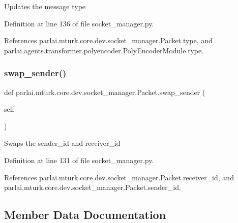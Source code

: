 \begin{DoxyVerb}Updates the message type\end{DoxyVerb}
 

Definition at line 136 of file socket\+\_\+manager.\+py.



References parlai.\+mturk.\+core.\+dev.\+socket\+\_\+manager.\+Packet.\+type, and parlai.\+agents.\+transformer.\+polyencoder.\+Poly\+Encoder\+Module.\+type.

\mbox{\label{classparlai_1_1mturk_1_1core_1_1dev_1_1socket__manager_1_1Packet_a52713ae6c40a1c3ef54c309baee5f092}} 
\subsubsection{\texorpdfstring{swap\+\_\+sender()}{swap\_sender()}}
{\footnotesize\ttfamily def parlai.\+mturk.\+core.\+dev.\+socket\+\_\+manager.\+Packet.\+swap\+\_\+sender (\begin{DoxyParamCaption}\item[{}]{self }\end{DoxyParamCaption})}

\begin{DoxyVerb}Swaps the sender_id and receiver_id\end{DoxyVerb}
 

Definition at line 131 of file socket\+\_\+manager.\+py.



References parlai.\+mturk.\+core.\+dev.\+socket\+\_\+manager.\+Packet.\+receiver\+\_\+id, and parlai.\+mturk.\+core.\+dev.\+socket\+\_\+manager.\+Packet.\+sender\+\_\+id.



\subsection{Member Data Documentation}
\mbox{\label{classparlai_1_1mturk_1_1core_1_1dev_1_1socket__manager_1_1Packet_a8a1db141ef73f663d032aa493825b4a2}} 
